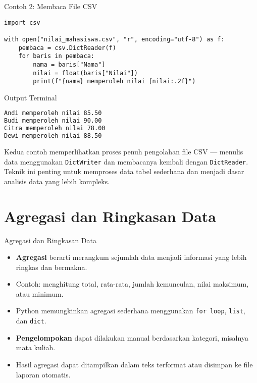 \documentclass[aspectratio=169, table]{beamer}
\begin{document}
\begin{frame}[fragile]{Contoh 2: Membaca File CSV}
\vspace{20pt}
\begin{lstlisting}[style=PythonStyle, caption={Membaca data CSV menggunakan DictReader}]
import csv

with open("nilai_mahasiswa.csv", "r", encoding="utf-8") as f:
    pembaca = csv.DictReader(f)
    for baris in pembaca:
        nama = baris["Nama"]
        nilai = float(baris["Nilai"])
        print(f"{nama} memperoleh nilai {nilai:.2f}")
\end{lstlisting}
\end{frame}

\begin{frame}[fragile]{Output Terminal}
\vspace{20pt}
\begin{lstlisting}[language=bash, caption={Hasil pembacaan file CSV di terminal}]
Andi memperoleh nilai 85.50
Budi memperoleh nilai 90.00
Citra memperoleh nilai 78.00
Dewi memperoleh nilai 88.50
\end{lstlisting}

Kedua contoh memperlihatkan proses penuh pengolahan file CSV —  
menulis data menggunakan \texttt{DictWriter} dan membacanya kembali dengan \texttt{DictReader}.  
Teknik ini penting untuk memproses data tabel sederhana dan menjadi dasar analisis data yang lebih kompleks.
\end{frame}

\section{Agregasi dan Ringkasan Data}

\begin{frame}{Agregasi dan Ringkasan Data}
\vspace{20pt}
\begin{itemize}
  \item \textbf{Agregasi} berarti merangkum sejumlah data menjadi informasi yang lebih ringkas dan bermakna.
  \item Contoh: menghitung total, rata-rata, jumlah kemunculan, nilai maksimum, atau minimum.
  \item Python memungkinkan agregasi sederhana menggunakan \texttt{for loop}, \texttt{list}, dan \texttt{dict}.
  \item \textbf{Pengelompokan} dapat dilakukan manual berdasarkan kategori, misalnya mata kuliah.
  \item Hasil agregasi dapat ditampilkan dalam teks terformat atau disimpan ke file laporan otomatis.
\end{itemize}
\end{frame}
\end{document}
